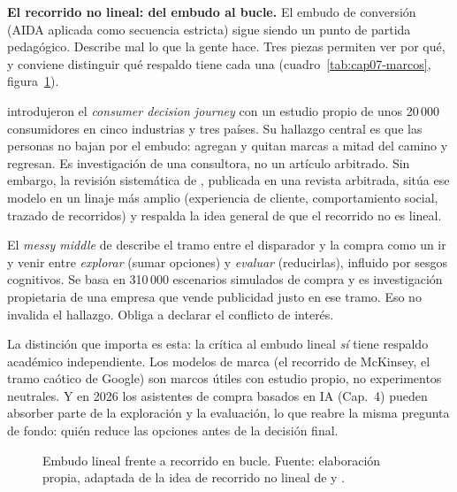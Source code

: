 \begin{cajaFrontera}
\textbf{El recorrido no lineal: del embudo al bucle.} El embudo de conversión
(AIDA aplicada como secuencia estricta) sigue siendo un punto de partida
pedagógico. Describe mal lo que la gente hace. Tres piezas permiten ver por
qué, y conviene distinguir qué respaldo tiene cada una
(cuadro~\ref{tab:cap07-marcos}, figura~\ref{fig:cap07-bucle}).

\textcite{court2009consumer} introdujeron el \textit{consumer decision journey}
con un estudio propio de unos 20\,000 consumidores en cinco industrias y tres
países. Su hallazgo central es que las personas no bajan por el embudo:
agregan y quitan marcas a mitad del camino y regresan. Es investigación de una
consultora, no un artículo arbitrado. Sin embargo, la revisión sistemática de
\textcite{santos2021consumer}, publicada en una revista arbitrada, sitúa ese
modelo en un linaje más amplio (experiencia de cliente, comportamiento
social, trazado de recorridos) y respalda la idea general de que el
recorrido no es lineal.

El \textit{messy middle} de \textcite{google2020messy} describe el tramo
entre el disparador y la compra como un ir y venir entre \emph{explorar}
(sumar opciones) y \emph{evaluar} (reducirlas), influido por sesgos
cognitivos. Se basa en 310\,000 escenarios simulados de compra y es
investigación propietaria de una empresa que vende publicidad justo en ese
tramo. Eso no invalida el hallazgo. Obliga a declarar el conflicto de interés.

La distinción que importa es esta: la crítica al embudo lineal \emph{sí} tiene
respaldo académico independiente. Los modelos de marca (el recorrido de
McKinsey, el tramo caótico de Google) son marcos útiles con estudio propio, no
experimentos neutrales. Y en 2026 los asistentes de compra basados en IA
(Cap.~4) pueden absorber parte de la exploración y la evaluación, lo que
reabre la misma pregunta de fondo: quién reduce las opciones antes de la
decisión final.
\end{cajaFrontera}

\begin{figure}[!htb]
  \centering
  \resizebox{0.95\textwidth}{!}{}
  \caption{Embudo lineal frente a recorrido en bucle. Fuente: elaboración
  propia, adaptada de la idea de recorrido no lineal de
  \textcite{court2009consumer} y \textcite{google2020messy}.}
  \label{fig:cap07-bucle}
\end{figure}

